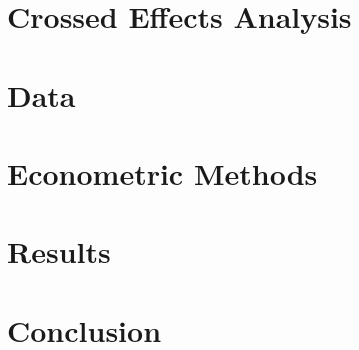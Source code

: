 \documentclass[12pt]{article}
\begin{document}
\section{Crossed Effects Analysis} \label{cross_ef}

\section{Data}\label{data}

\section{Econometric Methods} \label{emodel}

\section{Results} \label{results}

\section{Conclusion} \label{conclusion}
\end{document}

